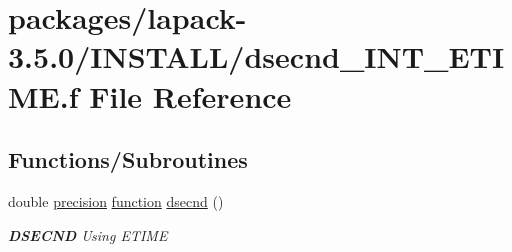 \hypertarget{dsecnd__INT__ETIME_8f}{}\section{packages/lapack-\/3.5.0/\+I\+N\+S\+T\+A\+L\+L/dsecnd\+\_\+\+I\+N\+T\+\_\+\+E\+T\+I\+M\+E.f File Reference}
\label{dsecnd__INT__ETIME_8f}
\subsection*{Functions/\+Subroutines}
\begin{DoxyCompactItemize}
\item 
double \hyperlink{numinquire_8h_a2c8e616467665d0b2814d4c1589ba74e}{precision} \hyperlink{afunc_8m_a7b5e596df91eadea6c537c0825e894a7}{function} \hyperlink{group__auxOTHERauxiliary_gafe21a6b76340ac0afd7f0f84326e7918}{dsecnd} ()
\begin{DoxyCompactList}\small\item\em {\bfseries D\+S\+E\+C\+N\+D} Using E\+T\+I\+M\+E \end{DoxyCompactList}\end{DoxyCompactItemize}
